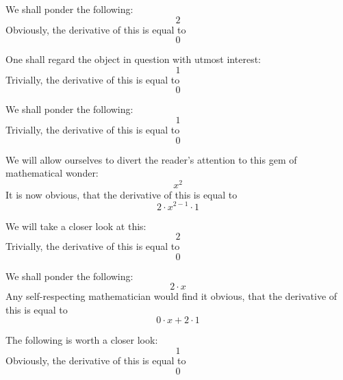 \documentclass{article}
\begin{document}
We shall ponder the following:
\begin{equation}
2 
\end{equation}
Obviously, the derivative of this is equal to
\begin{equation}
0 
\end{equation}

One shall regard the object in question with utmost interest:
\begin{equation}
1 
\end{equation}
Trivially, the derivative of this is equal to
\begin{equation}
0 
\end{equation}

We shall ponder the following:
\begin{equation}
1 
\end{equation}
Trivially, the derivative of this is equal to
\begin{equation}
0 
\end{equation}

We will allow ourselves to divert the reader's attention to this gem of mathematical wonder:
\begin{equation}
x ^{2 } 
\end{equation}
It is now obvious, that the derivative of this is equal to
\begin{equation}
2 \cdot x ^{2 - 1 } \cdot 1 
\end{equation}

We will take a closer look at this:
\begin{equation}
2 
\end{equation}
Trivially, the derivative of this is equal to
\begin{equation}
0 
\end{equation}

We shall ponder the following:
\begin{equation}
2 \cdot x 
\end{equation}
Any self-respecting mathematician would find it obvious, that the derivative of this is equal to
\begin{equation}
0 \cdot x + 2 \cdot 1 
\end{equation}

The following is worth a closer look:
\begin{equation}
1 
\end{equation}
Obviously, the derivative of this is equal to
\begin{equation}
0 
\end{equation}
\end{document}
